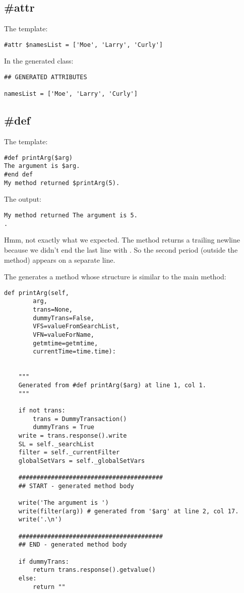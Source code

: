 \subsection{\#attr}
\label{inheritanceEtc.attr}

The template:
\begin{verbatim}
#attr $namesList = ['Moe', 'Larry', 'Curly']
\end{verbatim}

In the generated class:
\begin{verbatim}
## GENERATED ATTRIBUTES

namesList = ['Moe', 'Larry', 'Curly']
\end{verbatim}


\subsection{\#def}
\label{inheritanceEtc.def}

The template:
\begin{verbatim}
#def printArg($arg)
The argument is $arg.
#end def
My method returned $printArg(5).
\end{verbatim}

The output:
\begin{verbatim}
My method returned The argument is 5.
.
\end{verbatim}

Hmm, not exactly what we expected.  The method returns a trailing newline
because we didn't end the last line with .  So the second
period (outside the method) appears on a separate line.

The  generates a method  whose structure is similar
to the main method:
\begin{verbatim}
def printArg(self,
        arg,
        trans=None,
        dummyTrans=False,
        VFS=valueFromSearchList,
        VFN=valueForName,
        getmtime=getmtime,
        currentTime=time.time):


    """
    Generated from #def printArg($arg) at line 1, col 1.
    """

    if not trans:
        trans = DummyTransaction()
        dummyTrans = True
    write = trans.response().write
    SL = self._searchList
    filter = self._currentFilter
    globalSetVars = self._globalSetVars
    
    ########################################
    ## START - generated method body
    
    write('The argument is ')
    write(filter(arg)) # generated from '$arg' at line 2, col 17.
    write('.\n')
    
    ########################################
    ## END - generated method body
    
    if dummyTrans:
        return trans.response().getvalue()
    else:
        return ""
\end{verbatim}

